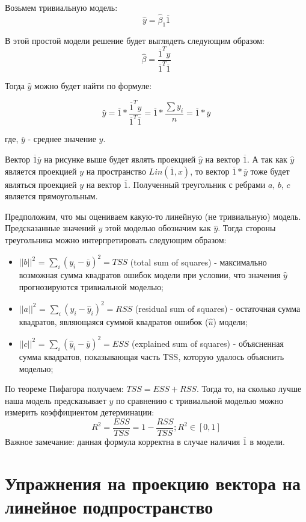 \documentclass[12pt]{article} %
\theoremstyle{definition} %
\def \hb{\hat{\beta}}
\def \hy{\hat{y}}
\def \hu{\hat{u}}
\begin{document}
Возьмем тривиальную модель:
\[
\hy = \hb_1 \overline{1}
\]

В этой простой модели решение будет выглядеть следующим образом:
\[
\hb = \frac{\overline{1}^Ty}{\overline{1}^T\overline{1}}
\]

Тогда $\hy$ можно будет найти по формуле:

\[
\hy = \overline{1} * \frac{\overline{1}^Ty}{\overline{1}^T\overline{1}} = \overline{1} *\frac{\sum y_i}{n} = \overline{1} *\overline{y}
\]

где, $\overline{y}$ - среднее значение $y$.

Вектор $\overline{1}\overline{y}$ на рисунке выше будет являть проекцией $\hy$ на вектор $\overline{1}$. А так как $\hy$ является проекцией $y$ на пространство $Lin(\overline{1}, x)$, то вектор $\overline{1} *\overline{y}$ тоже будет являться проекцией $y$ на вектор $\overline{1}$. Полученный треугольник с ребрами $a$, $b$, $c$ является прямоугольным.

Предположим, что мы оцениваем какую-то линейную (не тривиальную) модель. Предсказанные значений $y$ этой моделью обозначим как $\hy$. Тогда стороны треугольника можно интерпретировать следующим образом:

\begin{itemize}
    \item $||b||^2$ = $\sum_i (y_i - \overline{y})^2 = TSS$ (total sum of squares) - максимально возможная сумма квадратов ошибок модели при условии, что значения $\hy$ прогнозируются тривиальной моделью;
    \item $||a||^2$ = $\sum_i (y_i - \hy_i)^2 = RSS$ (residual sum of squares) - остаточная сумма квадратов, являющаяся суммой квадратов ошибок ($\hu$) модели;
    \item $||c||^2$ = $\sum_i (\hy_i - \overline{y})^2 = ESS$ (explained sum of squares) - объясненная сумма квадратов, показывающая часть TSS, которую удалось объяснить моделью;
\end{itemize}

По теореме Пифагора получаем: $TSS = ESS + RSS$. Тогда то, на сколько лучше наша модель предсказывает $y$ по сравнению с тривиальной моделью можно измерить коэффициентом детерминации:
\[
R^2 = \frac{ESS}{TSS} = 1- \frac{RSS}{TSS};
R^2 \in [0,1]
\]
Важное замечание: данная формула корректна в случае наличия $\overline{1}$ в модели.

\section{Упражнения на проекцию вектора на линейное подпространство}
\end{document}

